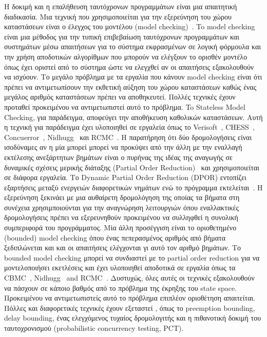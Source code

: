 Η δοκιμή και η επαλήθευση ταυτόχρονων προγραμμάτων είναι μια απαιτητική διαδικασία. Μια τεχνική που χρησιμοποιείται για
την εξερεύνηση του χώρου καταστάσεων είναι ο έλεγχος του μοντέλου (model checking)~\cite{WikipediaModelChecking}. To
model checking είναι μια μέθοδος για την τυπική επιβεβαίωση ταυτόχρονων προγραμμάτων και συστημάτων μέσω απαιτήσεων για
το σύστημα εκφρασμένων σε λογική φόρμουλα και την χρήση αποδοτικών αλγορίθμων που μπορούν να ελέγξουν το ορισθέν μοντέλο
όπως έχει οριστεί από το σύστημα ώστε να ελεγχθεί αν οι απαιτήσεις εξακολουθούν να ισχύουν. Το μεγάλο πρόβλημα με τα
εργαλία που κάνουν model checking είναι ότι πρέπει να αντιμετωπίσουν την εκθετική αύξηση του χώρου καταστάσεων καθώς
ένας μεγάλος αριθμός καταστάσεων πρέπει να αποθηκευτεί. Πολλές τεχνικές έχουν προταθεί προκειμένου να αντιμετωπιστεί
αυτό το πρόβλημα. To Stateless Model Checking, για παράδειγμα, αποφεύγει την αποθήκευση καθολικών καταστάσεων. Αυτή η
τεχνική για παράδειγμα έχει υλοποιηθεί σε εργαλεία όπως το Verisoft~\cite{SMC,Gode05}, CHESS~\cite{Musu08},
Concuerror~\cite{Chri13}, Nidhugg~\cite{AbdullaAronisAtigJonssonLeonardssonSagonasSMC2015} και RCMC~\cite{RCMC}. Η
παρατήρηση ότι δύο δρομολογήσεις είναι ισοδύναμες αν η μία μπορεί μπορεί να προκύψει από την άλλη με την εναλλαγή
εκτέλεσης ανεξάρτητων βημάτων είναι ο πυρήνας της ιδέας της αναγωγής σε δυναμικές σχέσεις μερικής διάταξης (Partial
Order Reduction)~\cite{Valmari1991, Peled1993, Godefroid1996,POR,JACM} και χρησιμοποιείται σε διάφορα εργαλεία. Το
Dynamic Partial Order Reduction (DPOR) εντοπίζει εξαρτήσεις μεταξύ ενεργειών διαφορετικών νημάτων ενώ το πρόγραμμα
εκτελείται~\cite{FlanaganDPOR,JACM}. Η εξερεύνηση ξεκινάει με μια αυθαίρετη δρομολόγηση της οποίας τα βήματα στη συνέχεια χρησιμποιούνται
για την αναγνώρηση λειτουργιών όπου εναλλακτικές δρομολογήσεις πρέπει να εξερευνηθούν προκειμένου να συλληφθεί η συνολική συμπεριφορά του προγράμματος.
Μία άλλη προσέγγιση είναι το οριοθετημένο (bounded) model checking \cite{BoundedModelChecking} όπου ένας πεπερασμένος αριθμός από βήματα ξεδιπλώνεται και
και οι απαιτήσεις ελέγχονται γι αυτό τον αριθμό βημάτων. Το bounded model checking μπορεί να συνδιαστεί με το partial order reduction για να μοντελοποιήσει
εκετλέσεις και έχει υλοποιηθεί αποδοτικά σε εργαλία όπως τα CBMC~\cite{CBMC}, Nidhugg~\cite{AbdullaAronisJohnssonSagonasDPOR2014} and RCMC~\cite{RCMC}. 
Δυστυχώς, όλες αυτές οι τεχνικές εξακολουθούν να πάσχουν σε κάποιο βαθμός από το πρόβλημα της έκρηξης του state space.
Προκειμένου να αντιμετωπιστείς αυτό το πρόβλημα επιπλέον οριοθέτηση απαιτείται. Πόλλες και διαφορετικές τεχνικές έχουν εξεταστεί \cite{Thomson}, όπως το 
preemption bounding, delay bounding, ένας ελεγχόμενος τυχαίος δρομολογιτής και η πιθανοτική δοκιμή του ταυτοχρονισμού (probabilistic concurrency testing, PCT).

